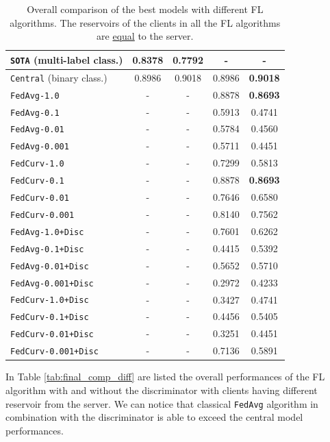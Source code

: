 {{{{\begin{table}[H]
\begin{tabular}{|l|c|c|c|c|}
        \texttt{SOTA} (multi-label class.) & 0.8378 & 0.7792 & - & - \\ \hline
        \texttt{Central} (binary class.) & 0.8986 & 0.9018 & 0.8986 & \textbf{0.9018} \\ \hline
        \texttt{FedAvg-1.0} & - & - & 0.8878 & \textbf{0.8693} \\ \hline
        \texttt{FedAvg-0.1} & - & - & 0.5913 & 0.4741 \\ \hline
        \texttt{FedAvg-0.01} & - & - & 0.5784 & 0.4560 \\ \hline
        \texttt{FedAvg-0.001} & - & - & 0.5711 & 0.4451 \\ \hline
        \texttt{FedCurv-1.0} & - & - & 0.7299 & 0.5813 \\ \hline
        \texttt{FedCurv-0.1} & - & - & 0.8878 & \textbf{0.8693} \\ \hline
        \texttt{FedCurv-0.01} & - & - & 0.7646 & 0.6580 \\ \hline
        \texttt{FedCurv-0.001} & - & - & 0.8140 & 0.7562 \\ \hline
        \texttt{FedAvg-1.0+Disc} & - & - & 0.7601 & 0.6262 \\ \hline
        \texttt{FedAvg-0.1+Disc} & - & - & 0.4415 & 0.5392 \\ \hline
        \texttt{FedAvg-0.01+Disc} & - & - & 0.5652 & 0.5710 \\ \hline
        \texttt{FedAvg-0.001+Disc} & - & - & 0.2972 & 0.4233 \\ \hline
        \texttt{FedCurv-1.0+Disc} & - & - & 0.3427 & 0.4741 \\ \hline
        \texttt{FedCurv-0.1+Disc} & - & - & 0.4456 & 0.5405 \\ \hline
        \texttt{FedCurv-0.01+Disc} & - & - & 0.3251 & 0.4451 \\ \hline
        \texttt{FedCurv-0.001+Disc} & - & - & 0.7136 & 0.5891 \\ \hline
    \end{tabular}
    \caption{Overall comparison of the best models with different FL algorithms. The reservoirs of the clients in all the FL algorithms are \underline{equal} to the server.}
    \label{tab:final_comp}
\end{table}

In Table \ref{tab:final_comp_diff} are listed the overall performances of the FL algorithm with and without the discriminator with clients having different reservoir from the server. We can notice that classical \texttt{FedAvg} algorithm in combination with the discriminator is able to exceed the central model performances.

}}}}
